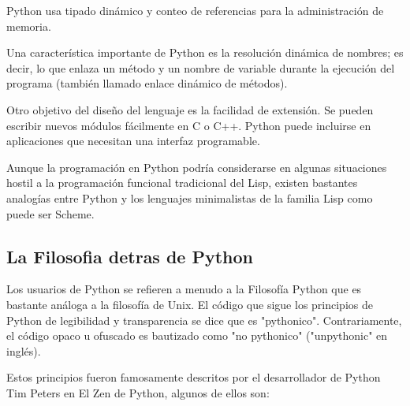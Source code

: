 Python usa tipado dinámico y conteo de referencias para la administración
de memoria.

Una característica importante de Python es la resolución dinámica de nombres;
 es decir, lo que enlaza un método y un nombre de variable durante la ejecución
  del programa (también llamado enlace dinámico de métodos).
  
Otro objetivo del diseño del lenguaje es la facilidad de extensión. Se pueden
escribir nuevos módulos fácilmente en C o C++. Python puede incluirse en
aplicaciones que necesitan una interfaz programable.

Aunque la programación en Python podría considerarse en algunas situaciones
hostil a la programación funcional tradicional del Lisp, existen bastantes
analogías entre Python y los lenguajes minimalistas de la familia Lisp como
puede ser Scheme.

\subsection{La Filosofia detras de Python}
Los usuarios de Python se refieren a menudo a la Filosofía Python que es bastante
análoga a la filosofía de Unix. El código que sigue los principios de Python de
legibilidad y transparencia se dice que es "pythonico". Contrariamente, el
código opaco u ofuscado es bautizado como "no pythonico" ("unpythonic" en inglés).

Estos principios fueron famosamente descritos por el desarrollador de Python Tim
Peters en El Zen de Python, algunos de ellos son:

